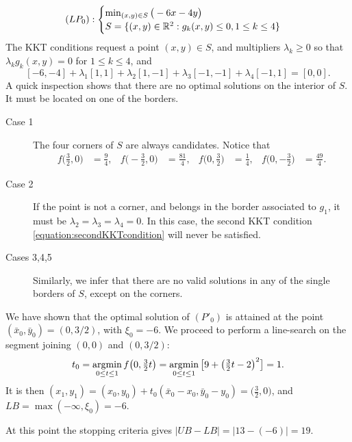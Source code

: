 \begin{example}
\begin{equation*}
(LP_0): \begin{cases} \min_{(x,y) \in S} \big( -6x-4y \big) \\ S = \{ (x,y) \in \mathbb{R}^2 : g_k(x,y) \leq 0, 1 \leq k \leq 4 \} \end{cases}
\end{equation*}
The KKT conditions request a point $(x,y) \in S$, and multipliers $\lambda_k \geq 0$ so that $\lambda_k g_k(x,y) = 0$ for $1\leq k \leq 4$, and
\begin{equation}\label{equation:secondKKTcondition}
[-6,-4] + \lambda_1 [1,1] + \lambda_2 [1,-1] + \lambda_3 [-1,-1] + \lambda_4 [-1,1] = [0,0].
\end{equation}
A quick inspection shows that there are no optimal solutions on the interior of $S$.  It must be located on one of the borders. 
\begin{description}
\item[Case 1] The four corners of $S$ are always candidates.  Notice that
\begin{align*}
f\big(\tfrac{3}{2}, 0\big) &= \tfrac{9}{4}, & f\big(-\tfrac{3}{2}, 0\big) &= \tfrac{81}{4}, &
f\big(0, \tfrac{3}{2}\big) &= \tfrac{1}{4}, & f\big(0, -\tfrac{3}{2}\big) &= \tfrac{49}{4}. 
\end{align*}
\item[Case 2] If the point is not a corner, and belongs in the border associated to $g_1$, it must be $\lambda_2=\lambda_3=\lambda_4=0$.  In this case, the second KKT condition \eqref{equation:secondKKTcondition} will never be satisfied. 
\item[Cases 3,4,5] Similarly, we infer that there are no valid solutions in any of the single borders of $S$, except on the corners.
\end{description}
We have shown that the optimal solution of $(P'_0)$ is attained at the point $(\bar{x}_0, \bar{y}_0) = (0, 3/2)$, with $\xi_0 = -6$. We proceed to perform a line-search on the segment joining $(0,0)$ and $(0,3/2)$:
\begin{equation*}
t_0 = \operatorname*{argmin}_{0 \leq t \leq 1} f\big(0, \tfrac{3}{2}t \big) = \operatorname*{argmin}_{0 \leq t \leq 1} \big[ 9 + \big(\tfrac{3}{2}t-2 \big)^2 \big] = 1.
\end{equation*}
It is then $(x_1,y_1)=(x_0,y_0)+t_0(\bar{x}_0-x_0, \bar{y}_0 - y_0) = \big( \tfrac{3}{2}, 0 \big)$, and $LB=\max(-\infty, \xi_0)=-6$.

At this point the stopping criteria gives $\lvert UB - LB \rvert = \lvert 13-(-6) \rvert = 19$.
\end{example}